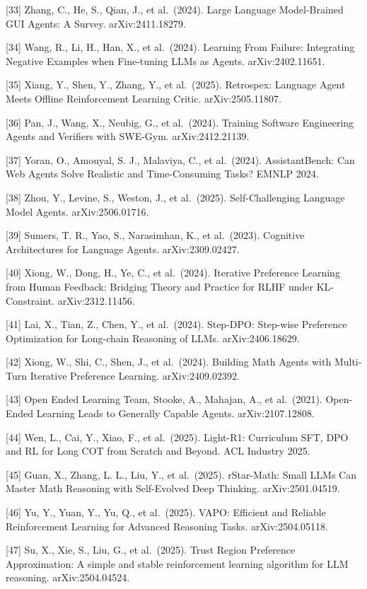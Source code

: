 {[}33{]} Zhang, C., He, S., Qian, J., et al.~(2024). Large Language Model-Brained GUI Agents: A Survey. arXiv:2411.18279.

{[}34{]} Wang, R., Li, H., Han, X., et al.~(2024). Learning From Failure: Integrating Negative Examples when Fine-tuning LLMs as Agents. arXiv:2402.11651.

{[}35{]} Xiang, Y., Shen, Y., Zhang, Y., et al.~(2025). Retrospex: Language Agent Meets Offline Reinforcement Learning Critic. arXiv:2505.11807.

{[}36{]} Pan, J., Wang, X., Neubig, G., et al.~(2024). Training Software Engineering Agents and Verifiers with SWE-Gym. arXiv:2412.21139.

{[}37{]} Yoran, O., Amouyal, S. J., Malaviya, C., et al.~(2024). AssistantBench: Can Web Agents Solve Realistic and Time-Consuming Tasks? EMNLP 2024.

{[}38{]} Zhou, Y., Levine, S., Weston, J., et al.~(2025). Self-Challenging Language Model Agents. arXiv:2506.01716.

{[}39{]} Sumers, T. R., Yao, S., Narasimhan, K., et al.~(2023). Cognitive Architectures for Language Agents. arXiv:2309.02427.

{[}40{]} Xiong, W., Dong, H., Ye, C., et al.~(2024). Iterative Preference Learning from Human Feedback: Bridging Theory and Practice for RLHF under KL-Constraint. arXiv:2312.11456.

{[}41{]} Lai, X., Tian, Z., Chen, Y., et al.~(2024). Step-DPO: Step-wise Preference Optimization for Long-chain Reasoning of LLMs. arXiv:2406.18629.

{[}42{]} Xiong, W., Shi, C., Shen, J., et al.~(2024). Building Math Agents with Multi-Turn Iterative Preference Learning. arXiv:2409.02392.

{[}43{]} Open Ended Learning Team, Stooke, A., Mahajan, A., et al.~(2021). Open-Ended Learning Leads to Generally Capable Agents. arXiv:2107.12808.

{[}44{]} Wen, L., Cai, Y., Xiao, F., et al.~(2025). Light-R1: Curriculum SFT, DPO and RL for Long COT from Scratch and Beyond. ACL Industry 2025.

{[}45{]} Guan, X., Zhang, L. L., Liu, Y., et al.~(2025). rStar-Math: Small LLMs Can Master Math Reasoning with Self-Evolved Deep Thinking. arXiv:2501.04519.

{[}46{]} Yu, Y., Yuan, Y., Yu, Q., et al.~(2025). VAPO: Efficient and Reliable Reinforcement Learning for Advanced Reasoning Tasks. arXiv:2504.05118.

{[}47{]} Su, X., Xie, S., Liu, G., et al.~(2025). Trust Region Preference Approximation: A simple and stable reinforcement learning algorithm for LLM reasoning. arXiv:2504.04524.

